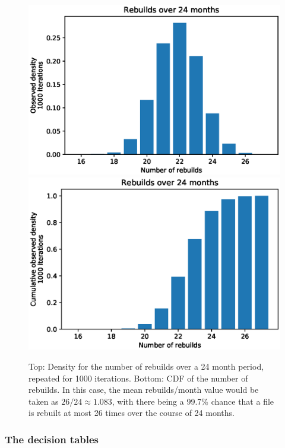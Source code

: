 \linespread{1}
\begin{figure}[h]
    \centering
    \includegraphics[scale=0.5]{RS-appendix-files/example_pmf.eps}
    \includegraphics[scale=0.5]{RS-appendix-files/example_cdf.eps}
    \caption{Top: Density for the number of rebuilds over a 24 month period, repeated for 1000 iterations. Bottom: CDF of the number of rebuilds. In this case, the mean rebuilds/month value would be taken as $26/24\approx1.083$, with there being a 99.7\% chance that a file is rebuilt at most 26 times over the course of 24 months.}
    \label{fig:sim_method}
\end{figure}

\pagebreak
\linespread{1}
\pagebreak
\subsubsection{The decision tables}




